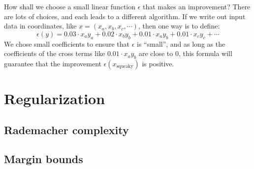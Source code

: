 \documentclass[openany, notitlepage, justified]{tufte-book}
\newcommand{\Dd}{\mathcal{D}}
\newcommand{\Ll}{\mathcal{L}}
\begin{document}
            How shall we choose a small linear function
            $\epsilon$ that makes an improvement?  There are lots of choices,
            and each leads to a different algorithm.  If we write out input
            data in coordinates, like $x = (x_a,x_b,x_c, \cdots)$, then one way is
            to define:
            $$
                \epsilon(y) = 0.03 \cdot x_a y_a + 0.02 \cdot x_b y_b +
                                0.01 \cdot x_a y_b + 0.01 \cdot x_c y_c + \cdots
            $$
            We chose small coefficients to ensure that $\epsilon$ is ``small'',
            and as long as the coefficients of the cross terms like $0.01 \cdot x_a
            y_b$ are close to $0$, this formula will guarantee that the
            improvement  $\epsilon(x_{\text{squeaky}})$ is positive.

    \newpage
    \chapter{Regularization}
        \section{Rademacher complexity}
        \section{Margin bounds}


\end{document}
